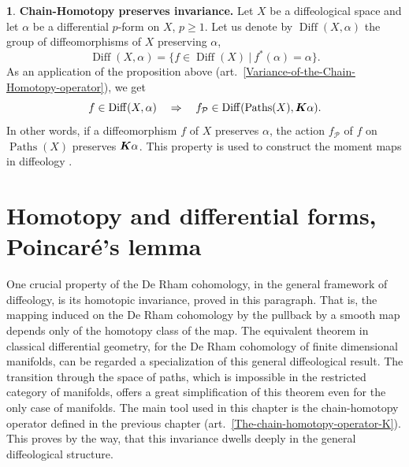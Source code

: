 \documentclass[11pt,reqno]{amsart}
\theoremstyle{definition}
\newtheorem{article}{}
\newcommand{\artlabel}[1]{{\bf #1.}}
\def \X{{X}}
\newcommand{\cP}{{\mathcal P}}
\newcommand{\eK}{\mbox{\boldmath $K$}}
\newcommand{\art}[1]{{(art.~\ref{#1})}}
\newcommand{\Paths}{\operatorname{Paths}}
\newcommand{\Diff}{\operatorname{Diff}}
\def \fPaths#1{#1_{\cP}}
\begin{document}
  \begin{article}\artlabel{Chain-Homotopy preserves invariance} 
    \label{Chain-Homotopy-preserves-invariance}
    Let $\X$ be a diffeological space and let $\alpha$ be a
    differential $p$-form on $\X$, $p \geq 1$. Let us denote
    by $\Diff(\X,\alpha)$ the group of diffeomorphisms of $\X$
    preserving $\alpha$,
    $$
      \Diff(\X,\alpha) = \{ f \in \Diff(\X) \ \vert \
      f^*(\alpha) = \alpha \}.
      $$
    As an application of the proposition above 
    \art{Variance-of-the-Chain-Homotopy-operator}, we get
    $$
      f \in \Diff(\X,\alpha) \quad \Rightarrow \quad
      \fPaths{f} \in \Diff(\Paths(\X),\eK\alpha). 
      $$ In other words, if a diffeomorphism $f$ of $\X$
    preserves $\alpha$, the action $\fPaths{f}$ of
    $f$ on $\Paths(\X)$ preserves $\eK\alpha$. This property
    is used to construct the moment maps in diffeology
    \cite{Piz07}.
  \end{article} %
  
  
  \section{Homotopy and differential forms, Poincar\'e's lemma} 
  \label{Section-Homotopy-and-differential-forms}
  
  \begin{text}
    One crucial property of the De Rham cohomology, in the general framework of diffeology,
    is its homotopic invariance, proved in this paragraph. That is, the mapping induced
    on the De Rham cohomology by the pullback by a smooth map
    depends only of the homotopy class of the map. The
    equivalent theorem in classical differential geometry,
    for the De Rham cohomology of finite dimensional
    manifolds, can be regarded a specialization of this
    general diffeological result. The transition through the
    space of paths, which is impossible in the restricted
    category of manifolds, offers a great simplification of
    this theorem even for the only case of manifolds.  The
    main tool used in this chapter is the chain-homotopy
    operator defined in the previous chapter
    \art{The-chain-homotopy-operator-K}. This proves by the way, that
    this invariance dwells deeply in the general diffeological structure.
  \end{text}
  
\end{document}
